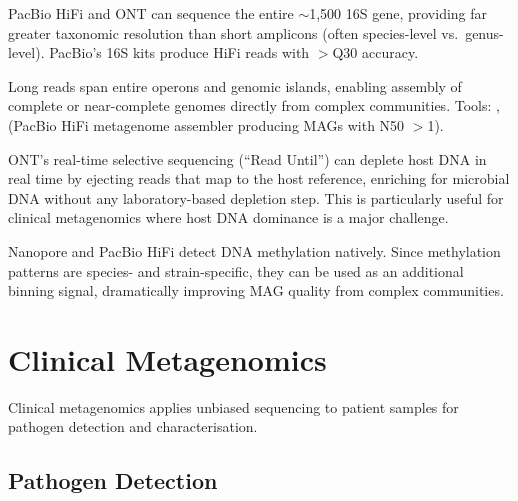 \begin{description}[style=nextline]
  \item[Full-length 16S sequencing] PacBio HiFi and ONT can sequence the entire $\sim$1,500\basepair{} 16S gene, providing far greater taxonomic resolution than short amplicons (often species-level vs.\ genus-level). PacBio's 16S kits produce HiFi reads with $>$Q30 accuracy.
  \item[Strain-resolved metagenomics] Long reads span entire operons and genomic islands, enabling assembly of complete or near-complete genomes directly from complex communities. Tools: ,  (PacBio HiFi metagenome assembler producing MAGs with N50 $>$1\megabase{}).
  \item[Nanopore adaptive sampling] ONT's real-time selective sequencing (``Read Until'') can deplete host DNA in real time by ejecting reads that map to the host reference, enriching for microbial DNA without any laboratory-based depletion step. This is particularly useful for clinical metagenomics where host DNA dominance is a major challenge.
  \item[Methylation-resolved metagenomics] Nanopore and PacBio HiFi detect DNA methylation natively. Since methylation patterns are species- and strain-specific, they can be used as an additional binning signal, dramatically improving MAG quality from complex communities.
\end{description}

\section{Clinical Metagenomics}
\label{sec:clinical_meta}

Clinical metagenomics applies unbiased sequencing to patient samples for pathogen detection and characterisation.

\subsection{Pathogen Detection}

